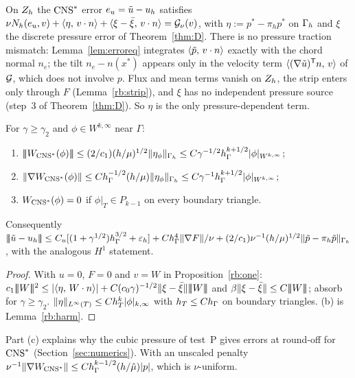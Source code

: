 \begin{proposition}\label{rb:one}
On $Z_h$ the $\mathrm{CNS}^\ast$ error $e_u=\tilde u-u_h$ satisfies $\nu N_h(e_u,v)+\langle \eta,\, v\cdot n\rangle+\langle \xi-\bar\xi,\, v\cdot n\rangle=\mathcal G_\nu(v)$, with $\eta:=p^\ast-\pi_hp^\ast$ on $\Gamma_h$ and $\xi$ the discrete pressure error of Theorem~\ref{thm:D}. There is no pressure traction mismatch: Lemma~\ref{lem:erroreq} integrates $\langle \tilde p,\, v\cdot n\rangle$ exactly with the chord normal $n_e$; the tilt $n_e-n(x^\ast)$ appears only in the velocity term $\langle (\nabla\tilde u)^{\mathsf T}n,\, v\rangle$ of $\mathcal G$, which does not involve $p$. Flux and mean terms vanish on $Z_h$, the strip enters only through $F$ (Lemma~\ref{rb:strip}), and $\xi$ has no independent pressure source (step~3 of Theorem~\ref{thm:D}). So $\eta$ is the only pressure-dependent term.
\end{proposition}

\begin{theorem}\label{rb:cns}
For $\gamma\ge\gamma_2$ and $\phi\in W^{k,\infty}$ near $\Gamma$:
\begin{enumerate}[label=(\alph*)]
\item $|\!|\!|W_{\mathrm{CNS}^\ast}(\phi)|\!|\!|\le(2/c_1)(h/\mu)^{1/2}\lVert \eta_\phi\rVert_{\Gamma_h}\le C\gamma^{-1/2}h_\Gamma^{k+1/2}|\phi|_{W^{k,\infty}}$;
\item $\lVert \nabla W_{\mathrm{CNS}^\ast}(\phi)\rVert\le Ch_\Gamma^{-1/2}(h/\mu)\lVert \eta_\phi\rVert_{\Gamma_h}\le C\gamma^{-1}h_\Gamma^{k+1/2}|\phi|_{W^{k,\infty}}$;
\item $W_{\mathrm{CNS}^\ast}(\phi)=0$ if $\phi|_T\in P_{k-1}$ on every boundary triangle.
\end{enumerate}
Consequently $|\!|\!|\tilde u-u_h|\!|\!|\le C_u[(1+\gamma^{1/2})h_\Gamma^{3/2}+\varepsilon_h]+Ch_\Gamma^4\lVert \nabla F\rVert/\nu+(2/c_1)\nu^{-1}(h/\mu)^{1/2}\lVert \tilde p-\pi_h\tilde p\rVert_{\Gamma_h}$, with the analogous $H^1$ statement.
\end{theorem}

\begin{proof}
With $u=0$, $F=0$ and $v=W$ in Proposition~\ref{rb:one}: $c_1\tnorm W^2\le|\ip\eta{W\cdot n}|+C(c_0\gamma)^{-1/2}\norm{\xi-\bar\xi}\tnorm W$ and $\beta\lVert \xi-\bar\xi\rVert\le C|\!|\!|W|\!|\!|$; absorb for $\gamma\ge\gamma_2$. $\lVert \eta\rVert_{L^\infty(T)}\le Ch_T^k|\phi|_{k,\infty}$ with $h_T\le Ch_\Gamma$ on boundary triangles. (b) is Lemma~\ref{rb:harm}.
\end{proof}

Part (c) explains why the cubic pressure of test~P gives errors at round-off for $\mathrm{CNS}^\ast$ (Section~\ref{sec:numerics}). With an unscaled penalty $\nu^{-1}\lVert \nabla W_{\mathrm{CNS}^\ast}\rVert\le Ch_\Gamma^{k-1/2}(h/\hat\mu)|p|$, which is $\nu$-uniform.

